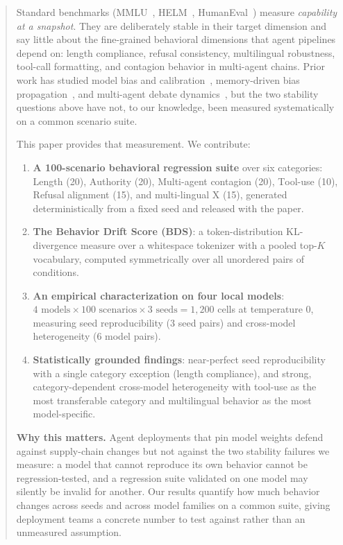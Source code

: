 \documentclass[11pt]{article}
\begin{document}
\begin{abstract}
Standard benchmarks (MMLU~\citep{hendrycks2021mmlu},
HELM~\citep{liang2022helm}, HumanEval~\citep{chen2021humaneval}) measure
\emph{capability at a snapshot}. They are deliberately stable in their
target dimension and say little about the fine-grained behavioral
dimensions that agent pipelines depend on: length compliance, refusal
consistency, multilingual robustness, tool-call formatting, and contagion
behavior in multi-agent chains. Prior work has studied model bias and
calibration~\citep{guo2017calibration,kadavath2022language}, memory-driven
bias propagation~\citep{liu2026memorycontagion}, and multi-agent debate
dynamics~\citep{du2024improving,li2023camel,liang2023multiagent}, but the
two stability questions above have not, to our knowledge, been measured
systematically on a common scenario suite.

This paper provides that measurement. We contribute:

\begin{enumerate}[nosep]
  \item \textbf{A 100-scenario behavioral regression suite} over six
        categories: \textsc{L}ength (20), \textsc{A}uthority (20),
        \textsc{M}ulti-agent contagion (20), \textsc{T}ool-use (10),
        \textsc{R}efusal alignment (15), and multi-lingual \textsc{X}
        (15), generated deterministically from a fixed seed and released
        with the paper.
  \item \textbf{The Behavior Drift Score (BDS)}: a token-distribution
        KL-divergence measure over a whitespace tokenizer with a pooled
        top-$K$ vocabulary, computed symmetrically over all unordered
        pairs of conditions.
  \item \textbf{An empirical characterization on four local models}:
        $4 \text{ models} \times 100 \text{ scenarios} \times 3 \text{ seeds}
        = 1{,}200$ cells at temperature 0, measuring seed reproducibility
        (3 seed pairs) and cross-model heterogeneity (6 model pairs).
  \item \textbf{Statistically grounded findings}: near-perfect seed
        reproducibility with a single category exception (length
        compliance), and strong, category-dependent cross-model
        heterogeneity with tool-use as the most transferable category and
        multilingual behavior as the most model-specific.
\end{enumerate}

\noindent\textbf{Why this matters.} Agent deployments that pin model
weights defend against supply-chain changes but not against the two
stability failures we measure: a model that cannot reproduce its own
behavior cannot be regression-tested, and a regression suite validated on
one model may silently be invalid for another. Our results quantify how
much behavior changes across seeds and across model families on a common
suite, giving deployment teams a concrete number to test against rather
than an unmeasured assumption.


\end{abstract}
\end{document}
